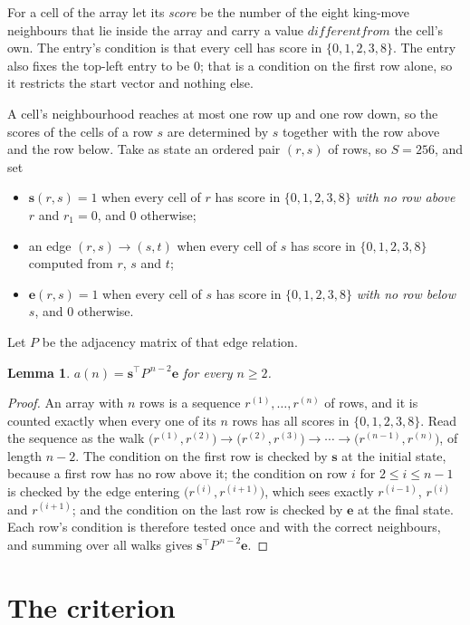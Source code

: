\documentclass[11pt,a4paper]{article}
\theoremstyle{plain}
\newtheorem{lemma}[theorem]{Lemma}
\theoremstyle{definition}
\begin{document}
For a cell of the array let its \emph{score} be the number of the eight king-move neighbours that lie inside
the array and carry a value $different from$ the cell's own. The entry's condition is that every cell
has score in $\{0,1,2,3,8\}$. The entry also fixes the top-left entry to be $0$; that is a condition on the first row alone, so it restricts the start vector and nothing else.

A cell's neighbourhood reaches at most one row up and one row down, so the scores of the
cells of a row $s$ are determined by $s$ together with the row above and the row below.
Take as state an ordered pair $(r,s)$ of rows, so $S=256$, and set
\begin{itemize}
\item $\mathbf{s}(r,s)=1$ when every cell of $r$ has score in $\{0,1,2,3,8\}$ \emph{with no row
above $r$} and $r_1=0$, and $0$ otherwise;
\item an edge $(r,s)\to(s,t)$ when every cell of $s$ has score in $\{0,1,2,3,8\}$ computed from
$r$, $s$ and $t$;
\item $\mathbf{e}(r,s)=1$ when every cell of $s$ has score in $\{0,1,2,3,8\}$ \emph{with no row
below $s$}, and $0$ otherwise.
\end{itemize}
Let $P$ be the adjacency matrix of that edge relation.

\begin{lemma}\label{lem:walk}
$a(n)=\mathbf{s}^{\!\top}P^{\,n-2}\mathbf{e}$ for every $n\ge2$.
\end{lemma}

\begin{proof}
An array with $n$ rows is a sequence $r^{(1)},\dots,r^{(n)}$ of rows, and it is counted
exactly when every one of its $n$ rows has all scores in $\{0,1,2,3,8\}$. Read the sequence as the
walk $\bigl(r^{(1)},r^{(2)}\bigr)\to\bigl(r^{(2)},r^{(3)}\bigr)\to\cdots\to
\bigl(r^{(n-1)},r^{(n)}\bigr)$, of length $n-2$. The condition on the first row is
checked by $\mathbf{s}$ at the initial state, because a first row has no row above it; the
condition on row $i$ for $2\le i\le n-1$ is checked by the edge entering
$\bigl(r^{(i)},r^{(i+1)}\bigr)$, which sees exactly $r^{(i-1)}$, $r^{(i)}$ and
$r^{(i+1)}$; and the condition on the last row is checked by $\mathbf{e}$ at the final
state. Each row's condition is therefore tested once and with the correct neighbours, and
summing over all walks gives $\mathbf{s}^{\!\top}P^{\,n-2}\mathbf{e}$.
\end{proof}

\section{The criterion}
\end{document}
